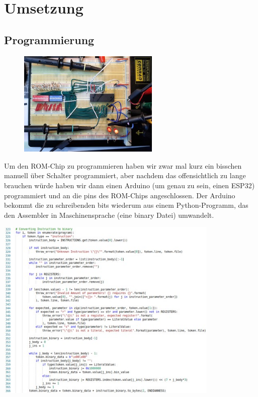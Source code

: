 \documentclass{scrartcl}
\begin{document}
    \newpage
    \section{Umsetzung}
    \vspace{-15pt}
    \subsection{Programmierung}
    \vspace{-15pt}

        \begin{figure}
        \vspace{-30pt}
        \begin{center}
        \includegraphics[width=0.6\textwidth]{ROM_Programmer_Manual_01}
        \end{center}
        \vspace{-20pt}
        \end{figure}

    Um den ROM-Chip zu programmieren haben wir zwar mal kurz ein bisschen manuell über Schalter programmiert, aber nachdem das offensichtlich zu lange brauchen würde haben wir dann einen Arduino (um genau zu sein, einen ESP32) programmiert und an die pins des ROM-Chips angeschlossen.
    Der Arduino bekommt die zu schreibenden bits wiederum aus einem Python-Programm, das den Assembler in Maschinensprache (eine binary Datei) umwandelt.

    \includegraphics[width=0.8\textwidth]{assembler_code}
\end{document}

